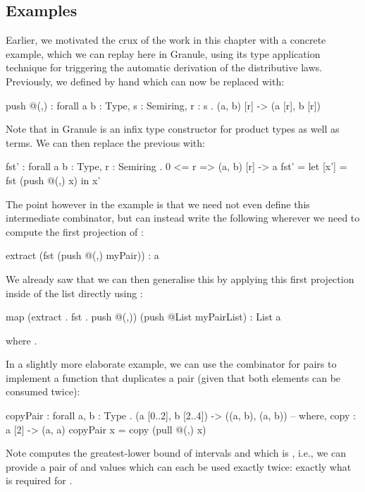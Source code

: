  \subsection{Examples}
 Earlier, we motivated the crux of the work in this chapter with a concrete
 example, which we can replay here in Granule, using its type
 application technique for triggering the automatic derivation of the
 distributive laws. Previously, we defined  by hand which can
 now be replaced with:
\begin{granule}
push @(,) : forall { a b : Type, s : Semiring, r : s } 
          . (a, b) [r] -> (a [r], b [r])
\end{granule}
 Note that in Granule \granin{(,)} is an infix type constructor for product
 types as well as terms. We can then replace the previous  with:
\begin{granule}
fst' : forall { a b : Type, r : Semiring } 
     . {0 <= r} => (a, b) [r] -> a
fst' = let [x'] = fst (push @(,) x) in x'
\end{granule}
 The point however in the example is that we need not even define this
 intermediate combinator, but can instead write the following
 wherever we need to compute the first projection
 of :
\begin{granule}
extract (fst (push @(,) myPair)) : a
\end{granule}
 We already saw that we can then generalise this by applying this first
 projection inside of the list directly using :
\begin{granule}
map (extract . fst . push @(,)) (push @List myPairList) : List a
\end{granule}
where .   
 
 In a slightly more elaborate example, we can use the  combinator
 for pairs to implement a function that duplicates a pair (given that both elements
 can be consumed twice):
\begin{granule}
copyPair : forall { a, b : Type } 
         . (a [0..2], b [2..4]) -> ((a, b), (a, b))
-- where, copy : a [2] -> (a, a)
copyPair x = copy (pull @(,) x) 
\end{granule}
 Note  computes the greatest-lower
 bound of intervals  and  which is
 , i.e., we can provide a pair of  and 
 values which can each be used exactly twice: exactly what is required
 for .
 
